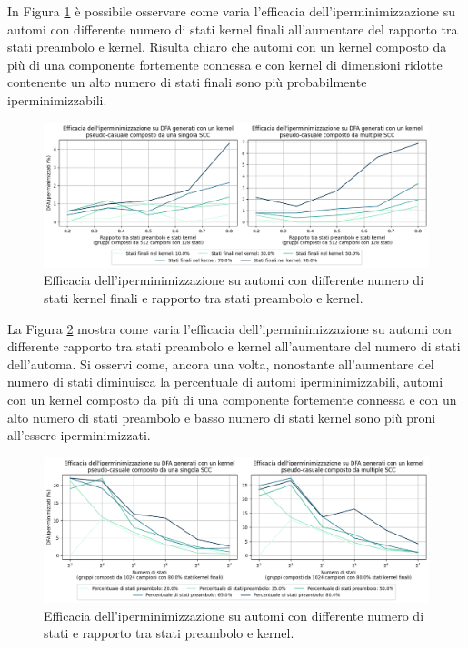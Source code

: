 \documentclass[a4paper,12pt,twoside, openright]{report} %
\begin{document}
In Figura \ref{fig:dfa-gen-fstates-pstates} è possibile osservare come varia l'efficacia dell'iperminimizzazione 
su automi con differente numero di stati kernel finali all'aumentare del rapporto tra stati preambolo e kernel.
Risulta chiaro che automi con un kernel composto da più di una componente fortemente connessa e con kernel di 
dimensioni ridotte contenente un alto numero di stati finali sono più probabilmente iperminimizzabili.

\begin{figure}[!htb]
  \centering
  \includegraphics[width=1\linewidth]{images/dfa_gen_fstates_pstates.png}
  \caption{\label{fig:dfa-gen-fstates-pstates}Efficacia dell'iperminimizzazione 
  su automi con differente numero di\\stati kernel finali e rapporto tra stati preambolo e kernel.}
\end{figure}

La Figura \ref{fig:dfa-gen-pstates-nstates} mostra come varia l'efficacia dell'iperminimizzazione 
su automi con differente rapporto tra stati preambolo e kernel all'aumentare del numero di stati dell'automa.
Si osservi come, ancora una volta, nonostante all'aumentare del numero di stati diminuisca la percentuale di automi
iperminimizzabili, automi con un kernel composto da più di una componente fortemente connessa e con un alto
numero di stati preambolo e basso numero di stati kernel sono più proni all'essere iperminimizzati.

\begin{figure}[!htb]
  \centering
  \includegraphics[width=1\linewidth]{images/dfa_gen_pstates_nstates.png}
  \caption{\label{fig:dfa-gen-pstates-nstates}Efficacia dell'iperminimizzazione 
  su automi con differente numero di stati e rapporto tra stati preambolo e kernel.}
\end{figure}
\end{document}
